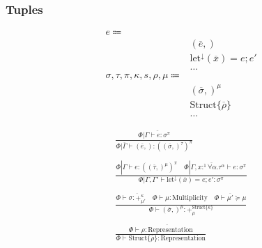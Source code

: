 \documentclass {article}
\begin{document}
\subsubsection{Tuples}
\begin{align*}
e \Coloneqq & \\
& (\overline e,) \tag{Tuple Introduction} \\
& \text{let}^\downarrow (\overline x) = e; e' \tag{Tuple Elimination} \\
& \dots \\
\sigma, \tau, \pi, \kappa, s, \rho, \mu \Coloneqq & \\
& (\overline \sigma,)^\mu \tag{Tuple} \\
& \text{Struct} \{ \overline \rho \} \tag{Struct Representation} \\
& \dots
\end{align*}

\begin{gather*}
\frac
{\Phi | \overline { \Gamma \vdash e : \sigma^\pi }}
{\Phi | \overline \Gamma  \vdash (\overline e,) : ((\overline \sigma,)^\tau)^\pi } \\
\\
\frac
{\Phi | \Gamma \vdash e : ((\overline \tau,)^\mu)^\pi \quad \Phi | \Gamma , \overline {x :^1 \forall \alpha. \tau^\alpha} \vdash e : \sigma^\pi}
{\Phi | \Gamma, \Gamma' \vdash \text{let}^\downarrow (\overline x) = e; e' : \sigma^\pi} \\
\\
\frac
{\Phi \vdash \overline {\sigma : +^{\kappa}_{\mu'}} \quad \Phi \vdash \mu : \text{Multiplicity} \quad \Phi \vdash \overline {\mu'} \succeq \mu }
{\Phi \vdash (\overline \sigma,)^\mu : +^{\text{Struct} \{ \overline \kappa\}}_\mu} \\
\\
\frac
{\Phi \vdash \overline {\rho : \text{Representation}}}
{\Phi \vdash \text{Struct} \{ \overline \rho \} : \text{Representation} } \\
\end{gather*}
\end{document}
